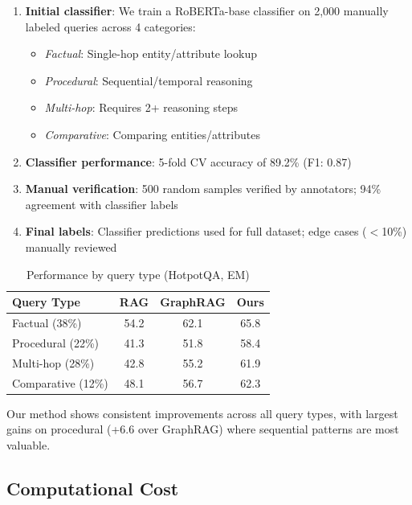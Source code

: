 \documentclass[10pt,twocolumn]{article}
\begin{document}
\begin{enumerate}
    \item \textbf{Initial classifier}: We train a RoBERTa-base classifier on 2,000 manually labeled queries across 4 categories:
    \begin{itemize}
        \item \textit{Factual}: Single-hop entity/attribute lookup
        \item \textit{Procedural}: Sequential/temporal reasoning
        \item \textit{Multi-hop}: Requires 2+ reasoning steps
        \item \textit{Comparative}: Comparing entities/attributes
    \end{itemize}
    
    \item \textbf{Classifier performance}: 5-fold CV accuracy of 89.2\% (F1: 0.87)
    
    \item \textbf{Manual verification}: 500 random samples verified by annotators; 94\% agreement with classifier labels
    
    \item \textbf{Final labels}: Classifier predictions used for full dataset; edge cases ($<$10\%) manually reviewed
\end{enumerate}

\begin{table}[h]
\centering
\caption{Performance by query type (HotpotQA, EM)}
\label{tab:query_type_perf}
\small
\begin{tabular}{@{}lccc@{}}
\toprule
\textbf{Query Type} & \textbf{RAG} & \textbf{GraphRAG} & \textbf{Ours} \\
\midrule
Factual (38\%) & 54.2 & 62.1 & 65.8 \\
Procedural (22\%) & 41.3 & 51.8 & 58.4 \\
Multi-hop (28\%) & 42.8 & 55.2 & 61.9 \\
Comparative (12\%) & 48.1 & 56.7 & 62.3 \\
\bottomrule
\end{tabular}
\end{table}

Our method shows consistent improvements across all query types, with largest gains on procedural (+6.6 over GraphRAG) where sequential patterns are most valuable.


\subsection{Computational Cost}
\end{document}
